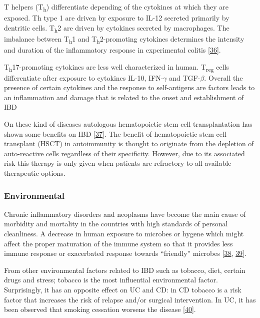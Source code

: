 \documentclass[
  a4paper,
]{book}
\begin{document}
T helpers (T\textsubscript{h}) differentiate depending of the cytokines at which they are exposed.
Th type 1 are driven by exposure to IL-12 secreted primarily by dentritic cells.
T\textsubscript{h}2 are driven by cytokines secreted by macrophages.
The imbalance between T\textsubscript{h}1 and T\textsubscript{h}2-promoting cytokines determines the intensity and duration of the inflammatory response in experimental colitis {[}\protect\hyperlink{ref-neurath1996}{36}{]}.

T\textsubscript{h}17-promoting cytokines are less well characterized in human.
T\textsubscript{reg} cells differentiate after exposure to cytokines IL-10, IFN-\(\gamma\) and TGF-\(\beta\).
Overall the presence of certain cytokines and the response to self-antigens are factors leads to an inflammation and damage that is related to the onset and establishment of IBD

On these kind of diseases autologous hematopoietic stem cell transplantation has shown some benefits on IBD {[}\protect\hyperlink{ref-corraliza}{37}{]}.
The benefit of hematopoietic stem cell transplant (HSCT) in autoimmunity is thought to originate from the depletion of auto-reactive cells regardless of their specificity.
However, due to its associated risk this therapy is only given when patients are refractory to all available therapeutic options.

\hypertarget{environmental}{%
\subsubsection{Environmental}\label{environmental}}

Chronic inflammatory disorders and neoplasms have become the main cause of morbidity and mortality in the countries with high standards of personal cleanliness.
A decrease in human exposure to microbes or hygene which might affect the proper maturation of the immune system so that it provides less immune response or exacerbated response towards ``friendly'' microbes {[}\protect\hyperlink{ref-strachan1989}{38}, \protect\hyperlink{ref-scudellari2017}{39}{]}.

From other environmental factors related to IBD such as tobacco, diet, certain drugs and stress; tobacco is the most influential environmental factor.
Surprisingly, it has an opposite effect on UC and CD: in CD tobacco is a risk factor that increases the risk of relapse and/or surgical intervention.
In UC, it has been observed that smoking cessation worsens the disease {[}\protect\hyperlink{ref-thomas1998}{40}{]}.
\end{document}
